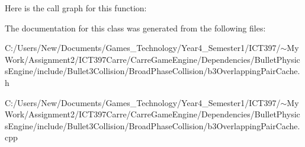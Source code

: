 Here is the call graph for this function:

The documentation for this class was generated from the following files:\begin{CompactItemize}
\item 
C:/Users/New/Documents/Games\_\-Technology/Year4\_\-Semester1/ICT397/$\sim$My Work/Assignment2/ICT397Carre/CarreGameEngine/Dependencies/BulletPhysicsEngine/include/Bullet3Collision/BroadPhaseCollision/b3OverlappingPairCache.h\item 
C:/Users/New/Documents/Games\_\-Technology/Year4\_\-Semester1/ICT397/$\sim$My Work/Assignment2/ICT397Carre/CarreGameEngine/Dependencies/BulletPhysicsEngine/include/Bullet3Collision/BroadPhaseCollision/b3OverlappingPairCache.cpp\end{CompactItemize}
